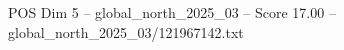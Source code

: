 \begin{textsample}{POS Dim 5 – global\_north\_2025\_03 – Score 17.00 – global\_north\_2025\_03/121967142.txt}
\end{textsample}
